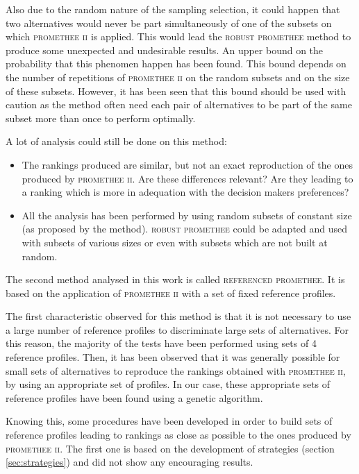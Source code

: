 Also due to the random nature of the sampling selection, it could happen that two alternatives would never be part simultaneously of one of the subsets on which \textsc{promethee ii} is applied.
This would lead the \textsc{robust promethee} method to produce some unexpected and undesirable results.
An upper bound on the probability that this phenomen happen has been found. 
This bound depends on the number of repetitions of \textsc{promethee ii} on the random subsets and on the size of these subsets.
However, it has been seen that this bound should be used with caution as the method often need each pair of alternatives to be part of the same subset more than once to perform optimally. 


A lot of analysis could still be done on this method:
\begin{itemize}
    \item The rankings produced are similar, but not an exact reproduction of the ones produced by \textsc{promethee ii}. Are these differences relevant? Are they leading to a ranking which is more in adequation with the decision makers preferences?
    \item All the analysis has been performed by using random subsets of constant size (as proposed by the method). \textsc{robust promethee} could be adapted and used with subsets of various sizes or even with subsets which are not built at random.
\end{itemize}
\vskip 0.5cm

The second method analysed in this work is called \textsc{referenced promethee}. It is based on the application of \textsc{promethee ii} with a set of fixed reference profiles.

The first characteristic observed for this method is that it is not necessary to use a large number of reference profiles to discriminate large sets of alternatives. 
For this reason, the majority of the tests have been performed using sets of 4 reference profiles.
Then, it has been observed that it was generally possible for small sets of alternatives to reproduce the rankings obtained with \textsc{promethee ii}, by using an appropriate set of profiles. 
In our case, these appropriate sets of reference profiles have been found using a genetic algorithm.

Knowing this, some procedures have been developed in order to build sets of reference profiles leading to rankings as close as possible to the ones produced by \textsc{promethee ii}. 
The first one is based on the development of strategies (section \ref{sec:strategies}) and did not show any encouraging results. 

